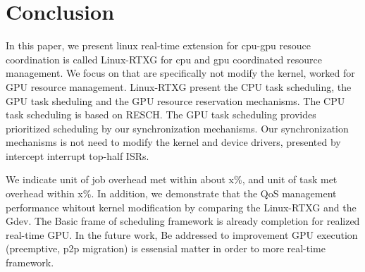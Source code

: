 \section{Conclusion}\label{sec:conclusion}
In this paper,
we present linux real-time extension for cpu-gpu resouce coordination is called Linux-RTXG for cpu and gpu coordinated resource management.
We focus on that are specifically not modify the kernel, worked for GPU resource management.
Linux-RTXG present the CPU task scheduling, the GPU task sheduling and the GPU resource reservation mechanisms.
The CPU task scheduling is based on RESCH.
The GPU task scheduling provides prioritized scheduling by our synchronization mechanisms.
Our synchronization mechanisms is not need to modify the kernel and device drivers, presented by intercept interrupt top-half ISRs.

We indicate unit of job overhead met within about x\%, and unit of task met overhead within x\%.
In addition, we demonstrate that the QoS management performance whitout kernel modification by comparing the Linux-RTXG and the Gdev.
The Basic frame of scheduling framework is already completion for realized real-time GPU.
In the future work, Be addressed to improvement GPU execution (preemptive, p2p migration) is essensial matter in order to more real-time framework.
